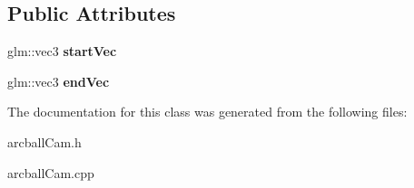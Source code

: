 \subsection*{Public Attributes}
\begin{DoxyCompactItemize}
\item 
\hypertarget{classarcball_cam_ab017c24cf064c943ac263afd89b2878b}{glm\-::vec3 {\bfseries start\-Vec}}\label{classarcball_cam_ab017c24cf064c943ac263afd89b2878b}

\item 
\hypertarget{classarcball_cam_a06cc9ffa74289b219e0e4d13ab077985}{glm\-::vec3 {\bfseries end\-Vec}}\label{classarcball_cam_a06cc9ffa74289b219e0e4d13ab077985}

\end{DoxyCompactItemize}


The documentation for this class was generated from the following files\-:\begin{DoxyCompactItemize}
\item 
arcball\-Cam.\-h\item 
arcball\-Cam.\-cpp\end{DoxyCompactItemize}
